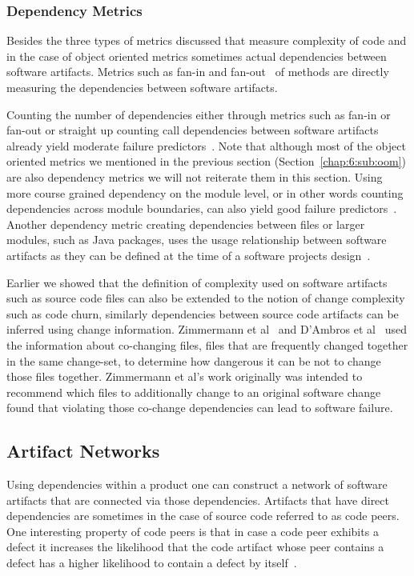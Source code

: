 \subsubsection{Dependency Metrics}
\label{chap:6:sub:depmet}
Besides the three types of metrics discussed that measure complexity of code and in the case of object oriented metrics sometimes actual dependencies between software artifacts.
Metrics such as fan-in and fan-out~\cite{henry:tse:1981} of methods are directly measuring the dependencies between software artifacts.

Counting the number of dependencies either through metrics such as fan-in or fan-out or straight up counting call dependencies between software artifacts already yield moderate failure predictors~\cite{cataldo:icse:2011,nagappan:icse:2006,arisholm:isese:2006,knab:msr:2006,shin:msr:2009}.
Note that although most of the object oriented metrics we mentioned in the previous section (Section~\ref{chap:6:sub:oom}) are also dependency metrics we will not reiterate them in this section. 
Using more course grained dependency on the module level, or in other words counting dependencies across module boundaries, can also yield good failure predictors~\cite{jiang:promise:2008}.
Another dependency metric creating dependencies between files or larger modules, such as Java packages, uses the usage relationship between software artifacts as they can be defined at the time of a software projects design~\cite{schroeter:isese:2006,dualaekoko:esem:2009}.

Earlier we showed that the definition of complexity used on software artifacts such as source code files can also be extended to the notion of change complexity such as code churn, similarly dependencies between source code artifacts can be inferred using change information.
Zimmermann et al~\cite{zimmermann:icse:2004} and D'Ambros et al~\cite{dambros:wcre:2009} used the information about co-changing files, files that are frequently changed together in the same change-set, to determine how dangerous it can be not to change those files together.
Zimmermann et al's work originally was intended to recommend which files to additionally change to an original software change found that violating those co-change dependencies can lead to software failure.


\subsection{Artifact Networks}
\label{chap:6:an}
Using dependencies within a product one can construct a network of software artifacts that are connected via those dependencies.
Artifacts that have direct dependencies are sometimes in the case of source code referred to as code peers.
One interesting property of code peers is that in case a code peer exhibits a defect it increases the likelihood that the code artifact whose peer contains a defect has a higher likelihood to contain a defect by itself~\cite{nguyen:icse:2010}.

